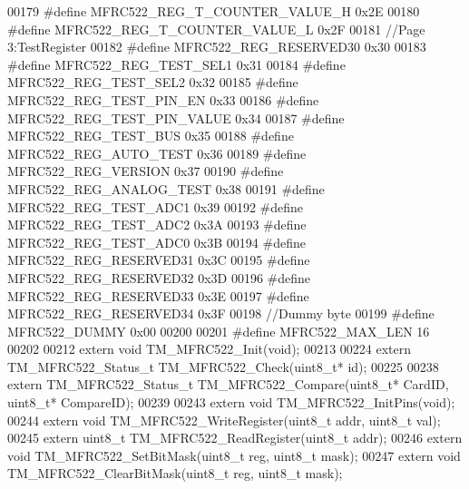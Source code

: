 \begin{DoxyCode}
00179 \textcolor{preprocessor}{#define MFRC522\_REG\_T\_COUNTER\_VALUE\_H   0x2E}
00180 \textcolor{preprocessor}{#define MFRC522\_REG\_T\_COUNTER\_VALUE\_L   0x2F}
00181 \textcolor{comment}{//Page 3:TestRegister }
00182 \textcolor{preprocessor}{#define MFRC522\_REG\_RESERVED30          0x30}
00183 \textcolor{preprocessor}{#define MFRC522\_REG\_TEST\_SEL1           0x31}
00184 \textcolor{preprocessor}{#define MFRC522\_REG\_TEST\_SEL2           0x32}
00185 \textcolor{preprocessor}{#define MFRC522\_REG\_TEST\_PIN\_EN         0x33}
00186 \textcolor{preprocessor}{#define MFRC522\_REG\_TEST\_PIN\_VALUE      0x34}
00187 \textcolor{preprocessor}{#define MFRC522\_REG\_TEST\_BUS            0x35}
00188 \textcolor{preprocessor}{#define MFRC522\_REG\_AUTO\_TEST           0x36}
00189 \textcolor{preprocessor}{#define MFRC522\_REG\_VERSION             0x37}
00190 \textcolor{preprocessor}{#define MFRC522\_REG\_ANALOG\_TEST         0x38}
00191 \textcolor{preprocessor}{#define MFRC522\_REG\_TEST\_ADC1           0x39  }
00192 \textcolor{preprocessor}{#define MFRC522\_REG\_TEST\_ADC2           0x3A   }
00193 \textcolor{preprocessor}{#define MFRC522\_REG\_TEST\_ADC0           0x3B   }
00194 \textcolor{preprocessor}{#define MFRC522\_REG\_RESERVED31          0x3C   }
00195 \textcolor{preprocessor}{#define MFRC522\_REG\_RESERVED32          0x3D}
00196 \textcolor{preprocessor}{#define MFRC522\_REG\_RESERVED33          0x3E   }
00197 \textcolor{preprocessor}{#define MFRC522\_REG\_RESERVED34          0x3F}
00198 \textcolor{comment}{//Dummy byte}
00199 \textcolor{preprocessor}{#define MFRC522\_DUMMY                   0x00}
00200 
00201 \textcolor{preprocessor}{#define MFRC522\_MAX\_LEN                 16}
00202 
00212 \textcolor{keyword}{extern} \textcolor{keywordtype}{void} TM\_MFRC522\_Init(\textcolor{keywordtype}{void});
00213 
00224 \textcolor{keyword}{extern} TM\_MFRC522\_Status\_t TM\_MFRC522\_Check(uint8\_t* \textcolor{keywordtype}{id});
00225 
00238 \textcolor{keyword}{extern} TM\_MFRC522\_Status\_t TM\_MFRC522\_Compare(uint8\_t* CardID, uint8\_t* CompareID);
00239 
00243 \textcolor{keyword}{extern} \textcolor{keywordtype}{void} TM\_MFRC522\_InitPins(\textcolor{keywordtype}{void});
00244 \textcolor{keyword}{extern} \textcolor{keywordtype}{void} TM\_MFRC522\_WriteRegister(uint8\_t addr, uint8\_t val);
00245 \textcolor{keyword}{extern} uint8\_t TM\_MFRC522\_ReadRegister(uint8\_t addr);
00246 \textcolor{keyword}{extern} \textcolor{keywordtype}{void} TM\_MFRC522\_SetBitMask(uint8\_t reg, uint8\_t mask);
00247 \textcolor{keyword}{extern} \textcolor{keywordtype}{void} TM\_MFRC522\_ClearBitMask(uint8\_t reg, uint8\_t mask);

\end{DoxyCode}
